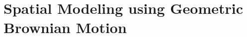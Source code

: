 
\chapter{Spatial Modeling using Geometric Brownian Motion}
\label{ch:GBM}

\begingroup
\newcommand{\score}{S}
\newcommand{\myalgo}{CoolAlgo}



%





\endgroup
